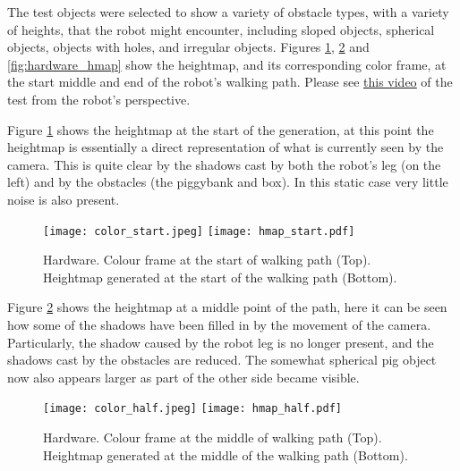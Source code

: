         \noindent
        The test objects were selected to show a variety of obstacle types, with a variety of heights, that the robot might encounter, including sloped objects, spherical objects, objects with holes, and irregular objects.
        Figures \ref{fig:hardware_hmap_start}, \ref{fig:hardware_hmap_mid} and \ref{fig:hardware_hmap} show the heightmap, and its corresponding color frame, at the start middle and end of the robot's walking path. Please see \href{https://youtu.be/AWgku4sVu5w}{\color{blue}\underline{this video}} of the test from the robot's perspective.
        
        \newpage
        \noindent
        Figure \ref{fig:hardware_hmap_start} shows the heightmap at the start of the generation, at this point the heightmap is essentially a direct representation of what is currently seen by the camera. This is quite clear by the shadows cast by both the robot's leg (on the left) and by the obstacles (the piggybank and box). In this static case
        very little noise is also present.
        \begin{figure}[h]
            \centering
            \hspace{-0.8cm}
            \texttt{[image: color\_start.jpeg]}
            \texttt{[image: hmap\_start.pdf]}
            \caption{Hardware. Colour frame at the start of walking path (Top). Heightmap generated at the start of the walking path (Bottom).}
            \label{fig:hardware_hmap_start}
        \end{figure}
        
        \newpage
        \noindent
        Figure \ref{fig:hardware_hmap_mid} shows the heightmap at a middle point of the path, here it can be seen how some of the shadows have been
        filled in by the movement of the camera. Particularly, the shadow caused by the robot leg is no longer present, and the shadows cast by the
        obstacles are reduced. The somewhat spherical pig object now also appears larger as part of the other side became visible.
        \begin{figure}[h]
            \centering
            \hspace{-0.8cm}
            \texttt{[image: color\_half.jpeg]}
            \texttt{[image: hmap\_half.pdf]}
            \caption{Hardware. Colour frame at the middle of walking path (Top). Heightmap generated at the middle of the walking path (Bottom).}
            \label{fig:hardware_hmap_mid}
        \end{figure}

